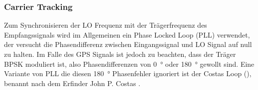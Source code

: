 \subsubsection{Carrier Tracking}
Zum Synchronisieren der LO Frequenz mit der Trägerfrequenz des Empfangssignals wird im Allgemeinen ein Phase Locked Loop (PLL) verwendet, der versucht die Phasendifferenz zwischen Eingangssignal und LO Signal auf null zu halten. Im Falle des GPS Signals ist jedoch zu beachten, dass der Träger BPSK moduliert ist, also Phasendifferenzen von \SI{0}{\degree} oder \SI{180}{\degree} gewollt sind. Eine Variante von PLL die diesen \SI{180}{\degree} Phasenfehler ignoriert ist der Costas Loop (), benannt nach dem Erfinder John P. Costas \cite{CostasSyncComm}.


